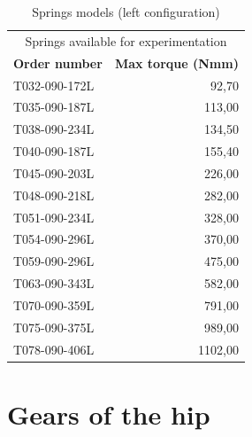 \begin{appendices}
        \begin{table}[htbp]
        \caption{Springs models (left configuration)}
        \centering
        \begin{tabular}{l|r}
        \multicolumn{2}{c}{\Large Springs available for experimentation} \\
        \multicolumn{1}{c}{\textbf{Order number}} & \multicolumn{1}{c|}{\textbf{Max torque (Nmm)}} \\ \hline
        T032-090-172L & 92,70   \\ \hline
        T035-090-187L & 113,00  \\ \hline
        T038-090-234L  & 134,50 \\ \hline
        T040-090-187L & 155,40  \\ \hline
        T045-090-203L & 226,00  \\ \hline
        T048-090-218L & 282,00  \\ \hline
        T051-090-234L & 328,00  \\ \hline
        T054-090-296L & 370,00  \\ \hline
        T059-090-296L & 475,00  \\ \hline
        T063-090-343L & 582,00  \\ \hline
        T070-090-359L & 791,00  \\ \hline
        T075-090-375L & 989,00  \\ \hline
        T078-090-406L & 1102,00 \\ 
        \end{tabular}
        \label{tab:available_springs_2}
        \end{table}


    \section{Gears of the hip}
    \label{app:hip_gears}


\end{appendices}
